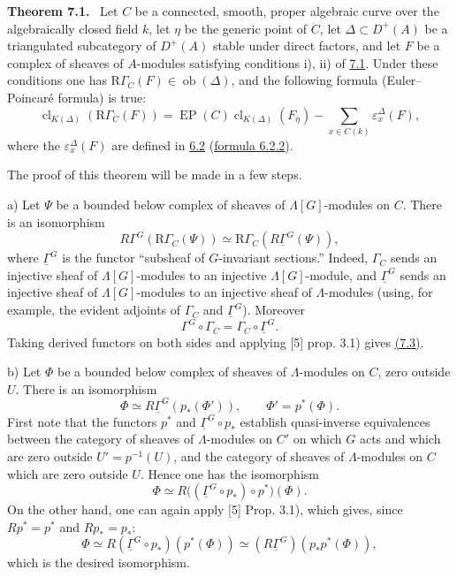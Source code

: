 \documentclass[11pt]{article}
\newenvironment{statement}[1]{\par\medskip\noindent\textbf{#1.}\ }{\par\medskip}
\providecommand{\EP}{\operatorname{EP}}
\providecommand{\Ob}{\operatorname{ob}}
\providecommand{\Ob}{\operatorname{ob}}
\providecommand{\EP}{\operatorname{EP}}
\providecommand{\Ob}{\operatorname{Ob}}
\providecommand{\clK}[1]{\operatorname{cl}_{K(#1)}}
\providecommand{\RG}{\mathrm R\Gamma}
\providecommand{\Ob}{\operatorname{ob}}
\providecommand{\Ob}{\operatorname{Ob}}
\begin{document}
\label{sga5:X:theorem:7.1}\begin{statement}{Theorem 7.1}
Let $C$ be a connected, smooth, proper algebraic curve over the algebraically closed field $k$, let $\eta$ be the generic point of $C$, let $\Delta\subset D^+(A)$ be a triangulated subcategory of $D^+(A)$ stable under direct factors, and let $F$ be a complex of sheaves of $A$-modules satisfying conditions i), ii) of \hyperref[sga5:X:theorem:7.1]{7.1}. Under these conditions one has $\RG_C(F)\in\Ob(\Delta)$, and the following formula (Euler--Poincaré formula) is true:
\[
\clK{\Delta}(\RG_C(F))
=
\EP(C)\clK{\Delta}(F_{\bar\eta})
-\sum_{x\in C(k)}\varepsilon_x^\Delta(F),
\tag{7.2}\label{sga5:X:equation:7.2}
\]
where the $\varepsilon_x^\Delta(F)$ are defined in \hyperref[sga5:X:subsubsection:6.2]{6.2} (\hyperref[sga5:X:equation:6.2.2]{formula 6.2.2}).
\end{statement}

The proof of this theorem will be made in a few steps.

a) Let $\Psi$ be a bounded below complex of sheaves of $\Lambda[G]$-modules on $C$. There is an isomorphism
\[
R\Gamma^G(\RG_C(\Psi))\simeq\RG_C(R\underline{\Gamma}^G(\Psi)),
\tag{7.3}\label{sga5:X:equation:7.3}
\]
where $\underline{\Gamma}^G$ is the functor ``subsheaf of $G$-invariant sections.'' Indeed, $\Gamma_C$ sends an injective sheaf of $\Lambda[G]$-modules to an injective $\Lambda[G]$-module, and $\underline{\Gamma}^G$ sends an injective sheaf of $\Lambda[G]$-modules to an injective sheaf of $\Lambda$-modules (using, for example, the evident adjoints of $\Gamma_C$ and $\underline{\Gamma}^G$). Moreover
\[
\Gamma^G\circ\Gamma_C=\Gamma_C\circ\underline{\Gamma}^G.
\]
Taking derived functors on both sides and applying [5] prop. 3.1) gives \hyperref[sga5:X:equation:7.3]{(7.3)}.

b) Let $\Phi$ be a bounded below complex of sheaves of $\Lambda$-modules on $C$, zero outside $U$. There is an isomorphism
\[
\Phi\simeq R\underline{\Gamma}^G(p_*(\Phi')),
\qquad \Phi'=p^*(\Phi).
\tag{7.4}\label{sga5:X:equation:7.4}
\]
First note that the functors $p^*$ and $\underline{\Gamma}^G\circ p_*$ establish quasi-inverse equivalences between the category of sheaves of $\Lambda$-modules on $C'$ on which $G$ acts and which are zero outside $U'=p^{-1}(U)$, and the category of sheaves of $\Lambda$-modules on $C$ which are zero outside $U$. Hence one has the isomorphism
\[
\Phi\simeq R\bigl((\underline{\Gamma}^G\circ p_*)\circ p^*\bigr)(\Phi).
\]
On the other hand, one can again apply [5] Prop. 3.1), which gives, since $Rp^*=p^*$ and $Rp_*=p_*$:
\[
\Phi\simeq R(\underline{\Gamma}^G\circ p_*)(p^*(\Phi))
\simeq (R\underline{\Gamma}^G)(p_*p^*(\Phi)),
\]
which is the desired isomorphism.
\end{document}

